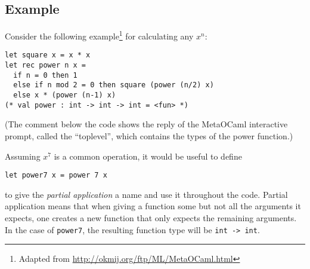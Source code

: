 \documentclass[12pt, titlepage]{article}
\begin{document}
\subsection{Example}
Consider the following example\footnote{Adapted from 
\url{http://okmij.org/ftp/ML/MetaOCaml.html}} for calculating any $x^n$:
\begin{lstlisting}
let square x = x * x
let rec power n x =
  if n = 0 then 1
  else if n mod 2 = 0 then square (power (n/2) x)
  else x * (power (n-1) x)
(* val power : int -> int -> int = <fun> *)
\end{lstlisting}

(The comment below the code shows the reply of the MetaOCaml interactive 
prompt, called the ``toplevel'', which contains the types of the power 
function.)

Assuming $x^7$ is a common operation, it would be useful to define
\begin{lstlisting}
let power7 x = power 7 x
\end{lstlisting}
to give the \emph{partial application} a name and use it throughout the code. 
Partial application means 
that when giving a function some but not all the arguments it expects, one 
creates a new function that only expects the remaining arguments. In the case 
of \lstinline|power7|, the resulting function type will be 
\lstinline|int -> int|.
\end{document}
